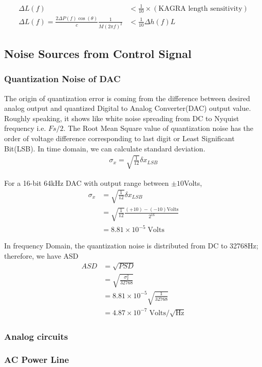 \begin{align}
   \Delta L(f) &< \frac{1}{10} \times (\text{KAGRA length sensitivity})\\
   \Delta L(f) =\frac{2 \Delta P(f) \cos(\theta)}{c} \frac{1}{M(2 \pi f)^2} &< \frac{1}{10} \Delta h(f) L
\end{align}




\subsection{Noise Sources from Control Signal}
\subsubsection{Quantization Noise of DAC}


The origin of quantization error is coming from the difference between desired analog output and quantized Digital to Analog Converter(DAC) output value. Roughly speaking, it shows like white noise spreading from DC to Nyquist frequency i.e. $Fs/2$.
The Root Mean Square value of quantization noise has the order of voltage difference corresponding to last digit or Least Significant Bit(LSB). In time domain, we can calculate standard deviation.
\begin{align}
   \sigma_x = \sqrt{\frac{1}{12}} \delta x_{LSB}
\end{align}

For a 16-bit 64kHz DAC with output range between $\pm 10$Volts, 
\begin{align}
    \sigma_x &= \sqrt{\frac{1}{12}} \delta x_{LSB} \\
             &= \sqrt{\frac{1}{12}} \frac{(+10)-(-10) \mathrm{Volts}}{2^{16}} \\
             &= 8.81 \times 10^{-5} \;\mathrm{Volts}
\end{align}

In frequency Domain, the quantization noise is distributed from DC to 32768Hz; therefore, we have ASD
\begin{align}
    ASD &= \sqrt{PSD} \\
        &= \sqrt{ \frac{\sigma_x^2}{32768} } \\
        &= 8.81 \times 10^{-5} \sqrt{\frac{1}{32768}} \\
        &= 4.87 \times 10^{-7} \;\mathrm{Volts}/\sqrt{\mathrm{Hz}} 
\end{align}

\subsubsection{Analog circuits}


\subsubsection{AC Power Line}



